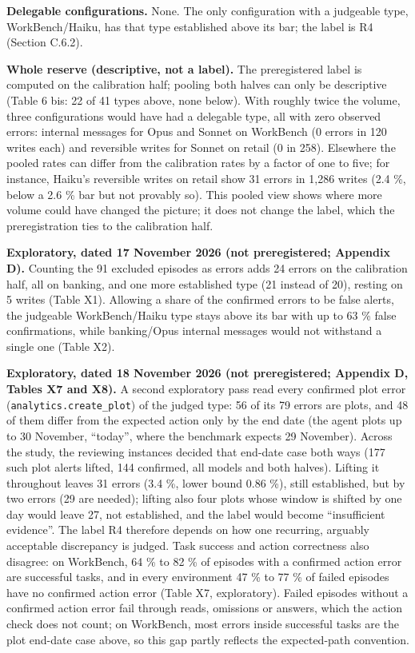 \textbf{Delegable configurations.} None. The only configuration with a judgeable type, WorkBench/Haiku, has that type established above its bar; the label is R4 (Section C.6.2).

\textbf{Whole reserve (descriptive, not a label).} The preregistered label is computed on the calibration half; pooling both halves can only be descriptive (Table 6 bis: 22 of 41 types above, none below). With roughly twice the volume, three configurations would have had a delegable type, all with zero observed errors: internal messages for Opus and Sonnet on WorkBench (0 errors in 120 writes each) and reversible writes for Sonnet on retail (0 in 258). Elsewhere the pooled rates can differ from the calibration rates by a factor of one to five; for instance, Haiku's reversible writes on retail show 31 errors in 1,286 writes (2.4 \%, below a 2.6 \% bar but not provably so). This pooled view shows where more volume could have changed the picture; it does not change the label, which the preregistration ties to the calibration half.

\textbf{Exploratory, dated 17 November 2026 (not preregistered; Appendix D).} Counting the 91 excluded episodes as errors adds 24 errors on the calibration half, all on banking, and one more established type (21 instead of 20), resting on 5 writes (Table X1). Allowing a share of the confirmed errors to be false alerts, the judgeable WorkBench/Haiku type stays above its bar with up to 63 \% false confirmations, while banking/Opus internal messages would not withstand a single one (Table X2).

\textbf{Exploratory, dated 18 November 2026 (not preregistered; Appendix D, Tables X7 and X8).} A second exploratory pass read every confirmed plot error (\texttt{analytics.\allowbreak{}create\_\allowbreak{}plot}) of the judged type: 56 of its 79 errors are plots, and 48 of them differ from the expected action only by the end date (the agent plots up to 30 November, ``today'', where the benchmark expects 29 November). Across the study, the reviewing instances decided that end-date case both ways (177 such plot alerts lifted, 144 confirmed, all models and both halves). Lifting it throughout leaves 31 errors (3.4 \%, lower bound 0.86 \%), still established, but by two errors (29 are needed); lifting also four plots whose window is shifted by one day would leave 27, not established, and the label would become ``insufficient evidence''. The label R4 therefore depends on how one recurring, arguably acceptable discrepancy is judged. Task success and action correctness also disagree: on WorkBench, 64 \% to 82 \% of episodes with a confirmed action error are successful tasks, and in every environment 47 \% to 77 \% of failed episodes have no confirmed action error (Table X7, exploratory). Failed episodes without a confirmed action error fail through reads, omissions or answers, which the action check does not count; on WorkBench, most errors inside successful tasks are the plot end-date case above, so this gap partly reflects the expected-path convention.

